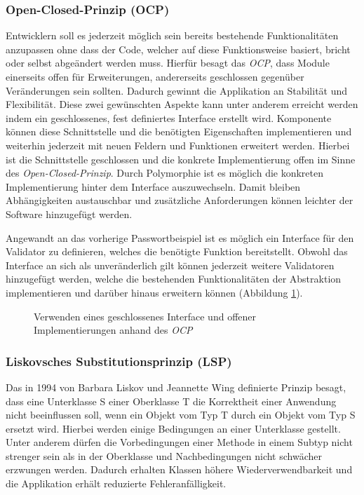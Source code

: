 \documentclass[conference]{IEEEtran}
\begin{document}
\subsubsection{Open-Closed-Prinzip (OCP)} Entwicklern soll es jederzeit möglich sein bereits bestehende Funktionalitäten anzupassen ohne dass der Code, welcher auf diese Funktionsweise basiert, bricht oder selbst abgeändert werden muss. Hierfür besagt das \emph{OCP}, dass Module einerseits offen für Erweiterungen, andererseits geschlossen gegenüber Veränderungen sein sollten. Dadurch gewinnt die Applikation an Stabilität und Flexibilität. Diese zwei gewünschten Aspekte kann unter anderem erreicht werden indem ein geschlossenes, fest definiertes Interface erstellt wird. Komponente können diese Schnittstelle und die benötigten Eigenschaften implementieren und weiterhin jederzeit mit neuen Feldern und Funktionen erweitert werden. Hierbei ist die Schnittstelle geschlossen und die konkrete Implementierung offen im Sinne des \emph{Open-Closed-Prinzip}. Durch Polymorphie ist es möglich die konkreten Implementierung hinter dem Interface auszuwechseln. Damit bleiben Abhängigkeiten austauschbar und zusätzliche Anforderungen können leichter der Software hinzugefügt werden. 
 
Angewandt an das vorherige Passwortbeispiel ist es möglich ein Interface für den Validator zu definieren, welches die benötigte Funktion bereitstellt. Obwohl das Interface an sich als unveränderlich gilt können jederzeit weitere Validatoren hinzugefügt werden, welche die bestehenden Funktionalitäten der Abstraktion implementieren und darüber hinaus erweitern können (Abbildung \ref{fig:OCP}). 

\begin{figure}[htbp]
	\small
	
	\caption{Verwenden eines geschlossenes Interface und offener Implementierungen anhand des \emph{OCP}}
	\label{fig:OCP}
\end{figure}



\subsubsection{Liskovsches Substitutionsprinzip (LSP)} Das in 1994 von Barbara Liskov und Jeannette Wing definierte Prinzip besagt, dass eine Unterklasse S einer Oberklasse T die Korrektheit einer Anwendung nicht beeinflussen soll, wenn ein Objekt vom Typ T durch ein Objekt vom Typ S ersetzt wird. Hierbei werden einige Bedingungen an einer Unterklasse gestellt. Unter anderem dürfen die Vorbedingungen einer Methode in einem Subtyp nicht strenger sein als in der Oberklasse und Nachbedingungen nicht schwächer erzwungen werden. Dadurch erhalten Klassen höhere Wiederverwendbarkeit und die Applikation erhält reduzierte Fehleranfälligkeit.
\end{document}
